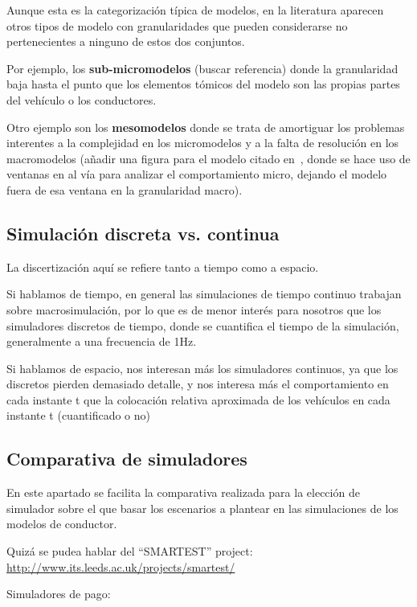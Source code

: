 Aunque esta es la categorización típica de modelos, en la literatura aparecen otros tipos de modelo con granularidades que pueden considerarse no pertenecientes a ninguno de estos dos conjuntos.

Por ejemplo, los \textbf{sub-micromodelos} (\TODO buscar referencia) donde la granularidad baja hasta el punto que los elementos tómicos del modelo son las propias partes del vehículo o los conductores.

Otro ejemplo son los \textbf{mesomodelos}\cite{munoz2001integrated}\cite{casas2011need} donde se trata de amortiguar los problemas interentes a la complejidad en los micromodelos y a la falta de resolución en los macromodelos (\TODO añadir una figura para el modelo citado en~\cite{munoz2001integrated}, donde se hace uso de ventanas en al vía para analizar el comportamiento micro, dejando el modelo fuera de esa ventana en la granularidad macro).

\subsection{Simulación discreta vs. continua}

La discertización aquí se refiere tanto a tiempo como a espacio.

Si hablamos de tiempo, en general las simulaciones de tiempo continuo trabajan sobre macrosimulación, por lo que es de menor interés para nosotros que los simuladores discretos de tiempo, donde se cuantifica el tiempo de la simulación, generalmente a una frecuencia de 1Hz.

Si hablamos de espacio, nos interesan más los simuladores continuos, ya que los discretos pierden demasiado detalle, y nos interesa más el comportamiento en cada instante t que la colocación relativa aproximada de los vehículos en cada instante t (cuantificado o no)

\subsection{Comparativa de simuladores}

En este apartado se facilita la comparativa realizada para la elección de simulador sobre el que basar los escenarios a plantear en las simulaciones de los modelos de conductor.

Quizá se pudea hablar del \enquote{SMARTEST} project: \url{http://www.its.leeds.ac.uk/projects/smartest/}

Simuladores de pago:

